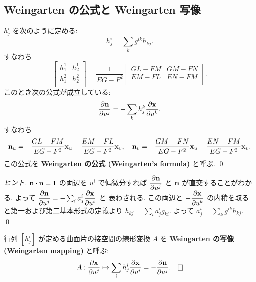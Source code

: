 \documentclass[12pt,twoside]{jarticle}
\begin{document}

\subsection{Weingarten の公式と Weingarten 写像}

\begin{question}
 \label{q:dn}
 $h^i_j$ を次のように定める:
 \begin{equation*}
  h^i_j = \sum_k g^{ik}h_{kj}.
 \end{equation*}
 すなわち
 \begin{equation*}
  \begin{bmatrix}
   h^1_1 & h^1_2 \\
   h^2_1 & h^2_2 \\
  \end{bmatrix}
  =
  \dfrac{1}{EG-F^2}
  \begin{bmatrix}
   GL-FM & GM-FN \\
   EM-FL & EN-FM \\
  \end{bmatrix}.
 \end{equation*}
 このとき次の公式が成立している:
 \begin{equation*}
  \dfrac{\partial{\mathbf n}}{\partial u^j}
  = - \sum_k h^k_j \dfrac{\partial{\mathbf x}}{\partial u^k}.
 \end{equation*}
 すなわち
 \begin{equation*}
  {\mathbf n}_u = - \frac{GL-FM}{EG-F^2} {\mathbf x}_u - \frac{EM-FL}{EG-F^2} {\mathbf x}_v, \quad
  {\mathbf n}_v = - \frac{GM-FN}{EG-F^2} {\mathbf x}_u - \frac{EN-FM}{EG-F^2} {\mathbf x}_v.
 \end{equation*}
 この公式を {\bf Weingarten の公式 (Weingarten's formula)} と呼ぶ. 
 \qed
\end{question}

\begin{proof}[ヒント]
 ${\mathbf n}\cdot{\mathbf n}=1$ の両辺を $u^i$ で偏微分すれば $\dfrac{\partial{\mathbf n}}{\partial u^j}$ 
 と ${\mathbf n}$ が直交することがわかる. 
 よって $\dfrac{\partial{\mathbf n}}{\partial u^j}= - \sum_i a^i_j \dfrac{\partial{\mathbf x}}{\partial u^i}$ と
 表わされる. この両辺と $-\dfrac{\partial{\mathbf x}}{\partial u^k}$ の内積を取る
 と第一および第二基本形式の定義より $h_{kj}=\sum_i a^i_j g_{ki}$.
 よって $a^i_j = \sum_k g^{ik}h_{kj}$.
 \qed
\end{proof}

\begin{definition}[Weingarten写像]
  行列 $[h^i_j]$ が定める曲面片の接空間の線形変換 $A$ を
 {\bf Weingarten の写像 (Weingarten mapping)} と呼ぶ:
 \begin{equation*}
  A : \pdfrac{\x}{u^j} 
  \mapsto \sum_i h^i_j \pdfrac{\x}{u^i} = -\dfrac{\d\n}{\d u^j}.
 \qed
 \end{equation*}
\end{definition}
\end{document}
